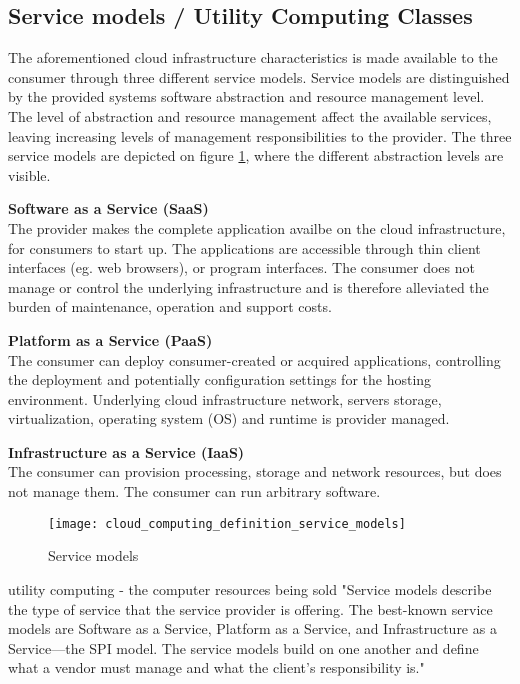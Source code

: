 \subsection{Service models / Utility Computing Classes}
The aforementioned cloud infrastructure characteristics is made available to the consumer through three different service models\cite{mell2011nist}.
Service models are distinguished by the provided systems software abstraction and resource management level. The level of abstraction and resource management affect the available services, leaving increasing levels of management responsibilities to the provider\cite[p. 52]{armbrust2010view}.
The three service models are depicted on figure \ref{fig:cloud_computing_definition_service_models}, where the different abstraction levels are visible.

\textbf{Software as a Service (SaaS)}\\
The provider makes the complete application availbe on the cloud infrastructure, for consumers to start up. The applications are accessible through thin client interfaces (eg. web browsers), or program interfaces. The consumer does not manage or control the underlying infrastructure and is therefore alleviated the burden of maintenance, operation and support costs\cite{youseff2008toward}.


\textbf{Platform as a Service (PaaS)}\\
The consumer can deploy consumer-created or acquired applications, controlling the deployment and potentially configuration settings for the hosting environment. Underlying cloud infrastructure network, servers storage, virtualization, operating system (OS) and runtime is provider managed.

\textbf{Infrastructure as a Service (IaaS)}\\
The consumer can provision processing, storage and network resources, but does not manage them. The consumer can run arbitrary software.

\begin{figure}[!htb]
  \texttt{[image: cloud\_computing\_definition\_service\_models]}  
  \caption{Service models}
  \label{fig:cloud_computing_definition_service_models}
\end{figure}

utility computing - the computer resources being sold
"Service models describe the type of service that the service provider is offering. The best-known service models are Software as a Service, Platform as a Service, and Infrastructure as a Service—the SPI model. The service models build on one another and define what a vendor must manage and what the client’s responsibility is."

